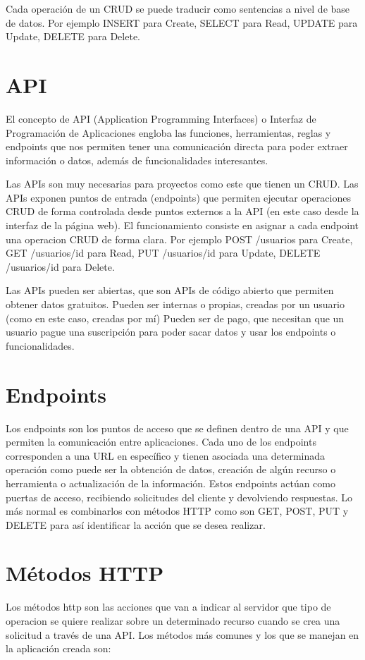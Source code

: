 Cada operación de un CRUD se puede traducir como sentencias a nivel de base de datos.
Por ejemplo INSERT para Create, SELECT para Read, UPDATE para Update, DELETE para Delete.
 


\section{API}
El concepto de API (Application Programming Interfaces) o Interfaz de Programación de Aplicaciones engloba las funciones, herramientas, reglas y endpoints que nos permiten tener una comunicación directa para poder extraer información o datos, además de funcionalidades interesantes.

Las APIs son muy necesarias para proyectos como este que tienen un CRUD. Las APIs exponen puntos de entrada (endpoints) que permiten ejecutar operaciones CRUD de forma controlada desde puntos externos a la API (en este caso desde la interfaz de la página web). El funcionamiento consiste en asignar a cada endpoint una operacion CRUD de forma clara. Por ejemplo POST /usuarios para Create, GET /usuarios/{id} para Read, PUT /usuarios/{id} para Update, DELETE /usuarios/{id} para Delete.

Las APIs pueden ser abiertas, que son APIs de código abierto que permiten obtener datos gratuitos. Pueden ser internas o propias, creadas por un usuario (como en este caso, creadas por mí) Pueden ser de pago, que necesitan que un usuario pague una suscripción para poder sacar datos y usar los endpoints o funcionalidades.


\section{Endpoints}
Los endpoints son los puntos de acceso que se definen dentro de una API y que permiten la comunicación entre aplicaciones. Cada uno de los endpoints corresponden a una URL en específico y tienen asociada una determinada operación como puede ser la obtención de datos, creación de algún recurso o herramienta o actualización de la información. Estos endpoints actúan como puertas de acceso, recibiendo solicitudes del cliente y devolviendo respuestas. Lo más normal es combinarlos con métodos HTTP como son GET, POST, PUT y DELETE para así identificar la acción que se desea realizar.


\section{Métodos HTTP}
Los métodos http son las acciones que van a indicar al servidor que tipo de operacion se quiere realizar sobre un determinado recurso cuando se crea una solicitud a través de una API. Los métodos más comunes y los que se manejan en la aplicación creada son:

